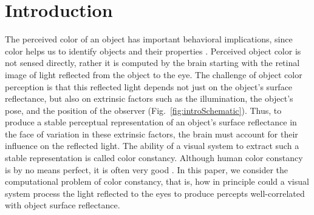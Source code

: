 \documentclass{jov}
\begin{document}
\section{Introduction}
The perceived color of an object has important behavioral implications, since color helps us to identify objects and their properties \cite{Mollon89, Jacobs81}.
Perceived object color is not sensed directly, rather it is computed by the brain starting with the retinal image of light reflected from the object to the eye.
The challenge of object color perception is that this reflected light depends not just on the object's surface reflectance, but also on extrinsic factors such as the illumination, the object's pose,
and the position of the observer (Fig.~\ref{fig:introSchematic}).
Thus, to produce a stable perceptual representation of an object's surface reflectance in the face of variation in these extrinsic factors, the brain must account for their influence on the reflected light.
The ability of a visual system to extract such a stable representation is called color constancy. Although human color constancy is by no means perfect, it is often very good \cite{FosterColorConstancy, BrainardColorConstancy}. 
In this paper, we consider the computational problem of color constancy, that is, how in principle could a visual system process the light reflected to the eyes to produce percepts well-correlated with object surface reflectance.
\end{document}
